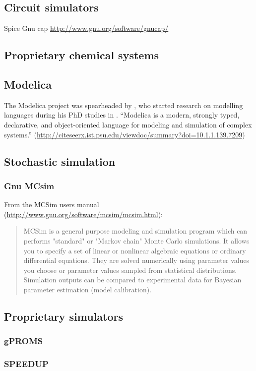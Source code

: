 \subsection{Circuit simulators}
Spice
Gnu cap \url{http://www.gnu.org/software/gnucap/}
\subsection{Proprietary chemical systems}

\subsection{Modelica}
The Modelica project was spearheaded by \xxx, who started research on
modelling languages during his PhD studies in \xxx.  ``Modelica is a modern, strongly typed, declarative, and object-oriented language for modeling and simulation of complex systems.'' (\url{http://citeseerx.ist.psu.edu/viewdoc/summary?doi=10.1.1.139.7209})

\subsection{Stochastic simulation}
\subsubsection{Gnu MCsim}
From the MCSim users manual (\url{http://www.gnu.org/software/mcsim/mcsim.html}):
\begin{quote}
MCSim is a general purpose modeling and simulation program which can performs "standard" or "Markov chain" Monte Carlo simulations.
It allows you to specify a set of linear or nonlinear algebraic equations or ordinary differential equations. 
They are solved numerically using parameter values you choose or parameter values sampled from statistical distributions. 
Simulation outputs can be compared to experimental data for Bayesian parameter estimation (model calibration).
\end{quote}

\subsection{Proprietary simulators}
\subsubsection{gPROMS}

\subsubsection{SPEEDUP}

